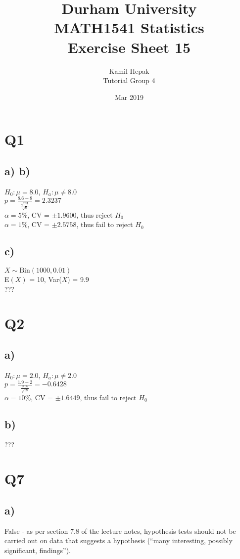 \documentclass[]{article}
\title{\vspace{-3cm}Durham University\\
    MATH1541 Statistics \\
	Exercise Sheet 15}
\author{Kamil Hepak\\
        Tutorial Group 4}
\date{Mar 2019}
\begin{document}
\maketitle

\section{Q1}
\subsection{a) b)}
$H_0: \mu = 8.0$, $H_a: \mu \neq 8.0$
\\
$p = \frac{8.6-8}{\frac{\sqrt{0.4}}{\sqrt{6}}} = 2.3237$
\\
$\alpha = 5\%$, CV = $\pm 1.9600$, thus reject $H_0$
\\
$\alpha = 1\%$, CV = $\pm 2.5758$, thus fail to reject $H_0$

\subsection{c)}
$X \sim \textrm{Bin}(1000, 0.01)$
\\
E$(X)$ = 10, Var($X$) = 9.9
\\
???

\section{Q2}
\subsection{a)}
$H_0: \mu = 2.0$, $H_a: \mu \neq 2.0$
\\
$p = \frac{1.9-2}{\frac{0.66}{\sqrt{18}}} = -0.6428$
\\
$\alpha = 10\%$, CV = $\pm 1.6449$, thus fail to reject $H_0$

\subsection{b)}
???

\section{Q7}
\subsection{a)}
False - as per section 7.8 of the lecture notes, hypothesis tests should not be carried out on data that suggests a hypothesis (``many interesting, possibly significant, findings'').
\end{document}
